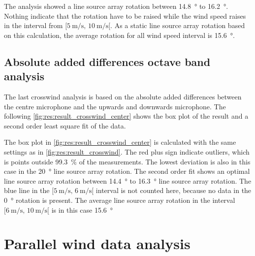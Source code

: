 The analysis showed a line source array rotation between \SI{14.8}{\degree} to  \SI{16.2}{\degree}. Nothing indicate that the rotation have to be raised while the wind speed raises in the interval from $[\SI{5}{\meter\per\second},\, \SI{10}{\meter\per\second}[ $. As a static line source array rotation based on this calculation, the average rotation for all wind speed interval is \SI{15.6}{\degree}.



\subsection{Absolute added differences octave band analysis}\label{res:ana:abs}
The last crosswind analysis is based on the absolute added differences between the centre microphone and the upwards and downwards microphone. The following \autoref{fig:res:result_crosswind_center} shows the box plot of the result and a second order least square fit of the data. 
 

The box plot in \autoref{fig:res:result_crosswind_center} is calculated with the same settings as in  \autoref{fig:res:result_crosswind}. The red plus sign indicate outliers, which is points outside \SI{99.3}{\percent} of the measurements. The lowest deviation is also in this case in the \SI{20}{\degree} line source array rotation. The second order fit shows an optimal line source array rotation between \SI{14.4}{\degree} to \SI{16.3}{\degree} line source array rotation. The blue line in the $[\SI{5}{\meter\per\second},\, \SI{6}{\meter\per\second}[ $ interval is not counted here, because no data in the \SI{0}{\degree} rotation is present. The average line source array rotation in the interval $[\SI{6}{\meter\per\second},\, \SI{10}{\meter\per\second}[ $ is in this case \SI{15.6}{\degree}
  
  

\section{Parallel wind data analysis}\label{res:par_data_ana}

